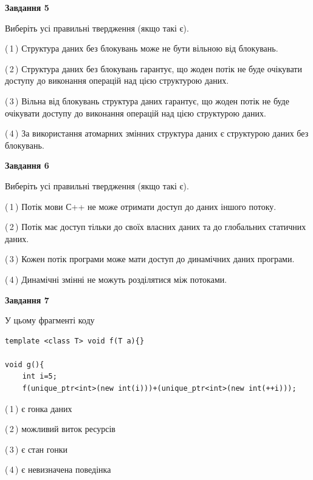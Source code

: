 \documentclass[12pt, ukrainian]{article}
\begin{document}
\begin {large}
{\begin{center}
\textbf{Завдання 5}
\end{center}

Виберіть усі правильні твердження (якщо такі є).\par
\vspace{2mm}

(\,1\,) Структура даних без блокувань може не бути вільною від блокувань.%

(\,2\,) Структура даних без блокувань гарантує, що жоден потік не буде очікувати доступу до виконання операцій над цією структурою даних.%

(\,3\,) Вільна від блокувань структура даних гарантує, що жоден потік не буде очікувати доступу до виконання операцій над цією структурою даних.%

(\,4\,) За використання атомарних змінних структура даних є структурою даних без блокувань.%
\newpage


\begin{center}
\textbf{Завдання 6}
\end{center}

Виберіть усі правильні твердження (якщо такі є).\par
\vspace{2mm}

(\,1\,) Потік мови С++ не може отримати доступ до даних іншого потоку.%

(\,2\,) Потік має доступ тільки до своїх власних даних та до глобальних статичних даних.%

(\,3\,) Кожен потік програми може мати доступ до динамічних даних програми.%

(\,4\,) Динамічні змінні не можуть розділятися між потоками.%


\begin{center}
\textbf{Завдання 7}
\end{center}

У цьому фрагменті коду
\begin{verbatim}
template <class T> void f(T a){}

void g(){
    int i=5;
    f(unique_ptr<int>(new int(i)))+(unique_ptr<int>(new int(++i)));
\end{verbatim}
(\,1\,) є гонка даних%

(\,2\,) можливий виток ресурсів%

(\,3\,) є стан гонки%

(\,4\,) є невизначена поведінка%

}
\end {large}

\vspace{4mm}
\newpage
\end{document}
